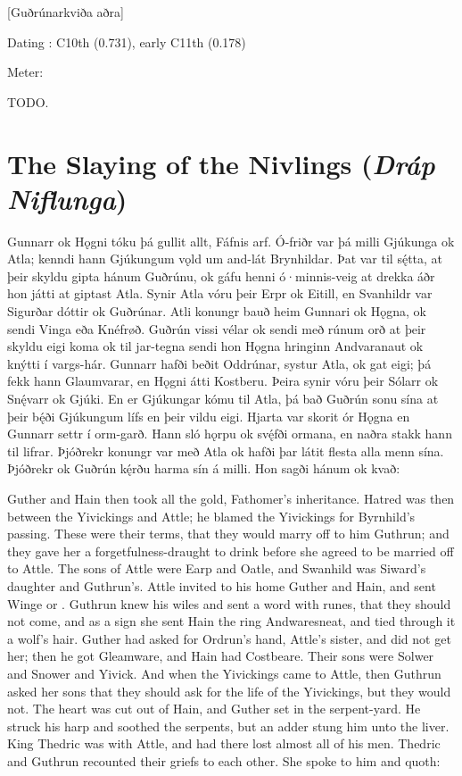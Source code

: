 [Guðrúnarkviða aðra]

\begin{flushright}%
Dating \parencite{Sapp2022}: C10th (0.731), early C11th (0.178)

Meter: \Fornyrdislag%
\end{flushright}

TODO.

\sectionline

\section{The Slaying of the Nivlings (\emph{Dráp Niflunga})}

\bpg\bpa Gunnarr ok Hǫgni tóku þá gullit allt, Fáfnis arf. Ó-friðr var þá milli Gjúkunga ok Atla; kenndi hann Gjúkungum vǫld um and-lát Brynhildar. Þat var til sę́tta, at þeir skyldu gipta hánum Guðrúnu, ok gáfu henni ó·minnis-veig at drekka áðr hon játti at giptast Atla. Synir Atla vóru þeir Erpr ok Eitill, en Svanhildr var Sigurðar dóttir ok Guðrúnar. Atli konungr bauð heim Gunnari ok Hǫgna, ok sendi Vinga eða Knéfrøð. Guðrún vissi vélar ok sendi með rúnum orð at þeir skyldu eigi koma ok til jar-tegna sendi hon Hǫgna hringinn Andvaranaut ok knýtti í vargs-hár. Gunnarr hafði beðit Oddrúnar, systur Atla, ok gat eigi; þá fekk hann Glaumvarar, en Hǫgni átti Kostberu. Þeira synir vóru þeir Sólarr ok Snę́varr ok Gjúki. En er Gjúkungar kómu til Atla, þá bað Guðrún sonu sína at þeir bę́ði Gjúkungum lífs en þeir vildu eigi. Hjarta var skorit ór Hǫgna en Gunnarr settr í orm-garð. Hann sló hǫrpu ok svę́fði ormana, en naðra stakk hann til lifrar. Þjóðrekr konungr var með Atla ok hafði þar látit flesta alla menn sína. Þjóðrekr ok Guðrún kę́rðu harma sín á milli. Hon sagði hánum ok kvað:\epa

\bpb Guther and Hain then took all the gold, Fathomer’s inheritance.  Hatred was then between the Yivickings and Attle; he blamed the Yivickings for Byrnhild’s passing.  These were their terms, that they would marry off to him Guthrun; and they gave her a forgetfulness-draught to drink before she agreed to be married off to Attle. The sons of Attle were Earp and Oatle, and Swanhild was Siward’s daughter and Guthrun’s. Attle invited to his home Guther and Hain, and sent Winge or . Guthrun knew his wiles and sent a word with runes, that they should not come, and as a sign she sent Hain the ring Andwaresneat, and tied through it a wolf’s hair. Guther had asked for Ordrun’s hand, Attle’s sister, and did not get her; then he got Gleamware, and Hain had Costbeare. Their sons were Solwer and Snower and Yivick. And when the Yivickings came to Attle, then Guthrun asked her sons that they should ask for the life of the Yivickings, but they would not. The heart was cut out of Hain, and Guther set in the serpent-yard. He struck his harp and soothed the serpents, but an adder stung him unto the liver. King Thedric was with Attle, and had there lost almost all of his men. Thedric and Guthrun recounted their griefs to each other. She spoke to him and quoth:\epb\epg

